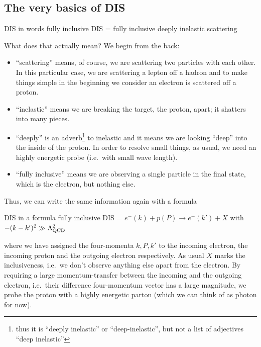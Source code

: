 \subsection{The very basics of DIS}
\label{sec:basics}
\begin{conclusionbox}{DIS in words}
    fully inclusive DIS = fully inclusive deeply inelastic scattering
\end{conclusionbox}
What does that actually mean? We begin from the back:
\begin{itemize}
    \item \enquote{scattering} means, of course, we are scattering two particles with each other.
        In this particular case, we are scattering a lepton off a hadron and to make things simple in the beginning we consider an electron is scattered off a proton.
    \item \enquote{inelastic} means we are breaking the target, the proton, apart; it shatters into many pieces.
    \item \enquote{deeply} is an adverb\footnote{thus it is \enquote{deeply inelastic} or \enquote{deep-inelastic}, but not a list of adjectives \enquote{deep inelastic}} to inelastic and it means we are looking \enquote{deep} into the inside of the proton.
        In order to resolve small things, as usual, we need an highly energetic probe (i.e.\ with small wave length).
    \item \enquote{fully inclusive} means we are observing a single particle in the final state, which is the electron, but nothing else.
\end{itemize}
Thus, we can write the same information again with a formula
\begin{conclusionbox}[label={box:DISformula}]{DIS in a formula}
    fully inclusive DIS = $e^-(k) + p(P) \to e^-(k') + X $ with $-(k - k')^2 \gg \Lambda_\text{QCD}^2$
\end{conclusionbox}
\noindent{}where we have assigned the four-momenta $k,P,k'$ to the incoming electron, the incoming proton and the outgoing electron respectively.
As usual $X$ marks the inclusiveness, i.e.\ we don't observe anything else apart from the electron.
By requiring a large momentum-transfer between the incoming and the outgoing electron, i.e.\ their difference four-momentum vector has a large magnitude, we probe the proton with a highly energetic parton (which we can think of as photon for now).

